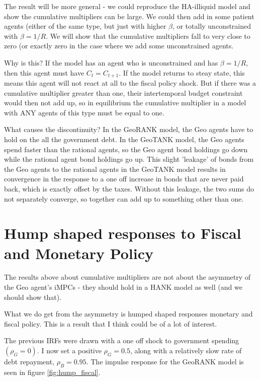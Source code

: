 \documentclass{article}
\begin{document}
The result will be more general - we could reproduce the HA-illiquid model and show the cumulative multipliers can be large. We could then add in some patient agents (either of the same type, but just with higher $\beta$, or totally unconstrained with $\beta=1/R$. We will show that the cumulative multipliers fall to very close to zero (or exactly zero in the case where we add some unconstrained agents.

Why is this? If the model has an agent who is unconstrained and has $\beta=1/R$,  then this agent must have $C_t = C_{t+1}$. If the model returns to steay state, this means this agent will not react at all to the fiscal policy shock. But if there was a cumulative multiplier greater than one, their intertemporal budget constraint would then not add up, so in equilibrium the cumulative multiplier in a model with ANY agents of this type must be equal to one.

What causes the discontinuity? In the GeoRANK model, the Geo agents have to hold on the all the government debt. In the GeoTANK model, the Geo agents spend faster than the rational agents, so the Geo agent bond holdings go down while the rational agent bond holdings go up. This slight 'leakage' of bonds from the Geo agents to the rational agents in the GeoTANK model results in convergence in the response to a one off increase in bonds that are never paid back, which is exactly offset by the taxes. Without this leakage, the two sums do not separately converge, so together can add up to something other than one.

\section{Hump shaped responses to Fiscal and Monetary Policy}

The results above about cumulative multipliers are not about the asymmetry of the Geo agent's iMPCs - they should hold in a HANK model as well (and we should show that).

What we do get from the asymmetry is humped shaped responses monetary and fiscal policy. This is a result that I think could be of a lot of interest.

The previous IRFs were drawn with a one off shock to government spending $(\rho_G=0)$. I now set a positive $\rho_G=0.5$, along with a relatively slow rate of debt repayment, $\rho_B=0.95$. The impulse response for the GeoRANK model is seen in figure \ref{fig:hump_fiscal}.
\end{document}
